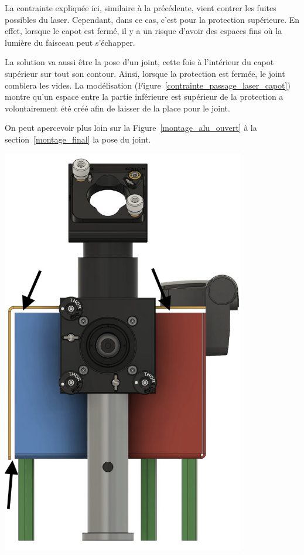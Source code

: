 \begin{minipage}[c]{0.6\textwidth}
    La contrainte expliquée ici, similaire à la précédente, vient contrer les fuites possibles du laser. Cependant, dans ce cas, c'est pour la protection supérieure. En effet, lorsque le capot est fermé, il y a un risque d'avoir des espaces fins où la lumière du faisceau peut s'échapper.

    La solution va aussi être la pose d'un joint, cette fois à l'intérieur du capot supérieur sur tout son contour. Ainsi, lorsque la protection est fermée, le joint comblera les vides. La modélisation (Figure~\ref{contrainte_passage_laser_capot}) montre qu'un espace entre la partie inférieure est supérieur de la protection a volontairement été créé afin de laisser de la place pour le joint.

    On peut apercevoir plus loin sur la Figure~\ref{montage_alu_ouvert} à la section~\ref{montage_final} la pose du joint.
\end{minipage}\hfill
\begin{minipage}[c]{0.38\textwidth}
    \begin{center}
        \includegraphics[width=0.8\textwidth]{assets/figures/Protections_laser/Securite_mecanique/Protection_entree_laser/contrainte_passage_laser_capot.jpeg}
    \end{center}
    \label{contrainte_passage_laser_capot}
\end{minipage}

